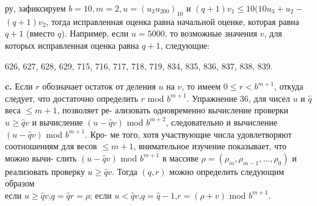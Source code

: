 \documentclass{/home/pkmixer/mai_practice/git_rep/mai_prac_2017/template/mai_book}
\begin{document}
ру, зафиксируем $b=10, m=2, u=(u_3u_200)_{10}$ и $(q+1)v_1\leqslant10(10u_3+u_2-$\linebreak
$(q+1)v_2$, тогда исправленная оценка равна начальной оценке, которая\linebreak
равна $q+1$ (вместо $q$). Например, если $u=5000$, то возможные значения\linebreak
$v$, для которых исправленная оценка равна $q+1$, следующие:
\begin{center}
626, 627, 628, 629, 715, 716, 717, 718, 719, 834, 835, 836, 837, 838, 839.
\end{center}
\newpage
\textbf{c.} Если $r$ обозначает остаток от деления $u$ на $v$, то имеем\linebreak
$0\leqslant{r}<b^{m+1}$, откуда следует, что достаточно определить $r$ mod\linebreak
$b^{m+1}$. Упражнение 36, для чисел $u$ и $\hat{q}$ веса $\leqslant m+1$, позволяет ре-\linebreak
ализовать одновременно вычисление проверки $u\geqslant\hat{q}v$ и вычисление\linebreak
$(u-\hat{q}v)$ mod $b^{m+2}$, следовательно и вычисление $(u-\hat{q}v)$ mod $b^{m+1}$. Кро-\linebreak
ме того, хотя участвующие числа удовлетворяют соотношениям для\linebreak
весов $\leqslant{m+1}$, внимательное изучение показывает, что можно вычи-\linebreak
слить $(u-\hat{q}v)$ mod $b^{m+1}$ в массиве $\rho=(\rho_m,\rho_{m-1},...,\rho_0)$ и реализовать\linebreak
проверку $u\geqslant\hat{q}v$. Тогда $(q,r)$ можно определить следующим образом\\

\noindent
\hspace*{40pt}если $u\geqslant\hat{q}v$,\hspace{20pt}$q=\hat{q}$\hspace{45pt}$r=\rho$;\newline
\hspace*{40pt}если $u<\hat{q}v$,\hspace{20pt}$q=\hat{q}-1$,\hspace{25pt}$r=(\rho+v)$ mod $b^{m+1}$.\\
\end{document}
